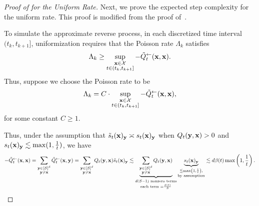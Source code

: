 \documentclass{article} %
\newcommand{\bfx}{{\bf x}}
\newcommand{\bfy}{ {\bf y}}
\begin{document}
\begin{proof}[Proof of  for the Uniform Rate] Next, we prove the expected step complexity for the uniform rate. This proof is modified from the proof of~\cite[Theorem~4.9]{ren2025discrete}.

To simulate the approximate reverse process, in each discretized time interval $(t_k, t_{k+1}]$, uniformization requires that the Poisson rate $\Lambda_k$ satisfies
    \[
        \Lambda_k \geq \sup_{\substack{\bfx \in \mathcal{X} \\ t \in (t_k, t_{k+1}]}} -\tilde{Q}^{\leftarrow}_t (\bfx, \bfx).
    \]
    Thus, suppose we choose the Poisson rate to be
    \begin{equation}\label{eq:Pois_rate_bound_uniform}
        \Lambda_k = C \cdot \sup_{\substack{\bfx \in \mathcal{X} \\ t \in (t_k, t_{k+1}]}} -\tilde{Q}^{\leftarrow}_t (\bfx, \bfx),
    \end{equation}
    for some constant $C \geq 1$.

    Thus, under the assumption that $\tilde{s}_{t}(\bfx)_\bfy \asymp s_{t}(\bfx)_\bfy$ when $Q_t(\bfy, \bfx) > 0$ and $s_t(\bfx)_\bfy \lesssim \max(1, \frac{1}{t})$, we have
    \begin{equation}\label{eq:sQ_bound_uniform}
    -\tilde{Q}_{t}^{\leftarrow}(\bfx, \bfx) = \sum_{\substack{\bfy\in{[S]^d} \\ \bfy\neq \bfx}} \tilde{Q}_{t}^{\leftarrow}(\bfx, \bfy) = \sum_{\substack{\bfy\in{[S]^d} \\ \bfy\neq \bfx}} Q_t(\bfy, \bfx) \tilde{s}_t(\bfx)_\bfy \lesssim \underbrace{\sum_{\substack{\bfy\in{[S]^d} \\ \bfy\neq \bfx}} Q_t(\bfy, \bfx)}_{\substack{d(S-1) \text{ nonzero terms} \\ \text{each term }=\frac{\beta(t)}{S}}} \underbrace{{s}_t(\bfx)_\bfy}_{\substack{\lesssim \max \left(1, \frac{1}{t} \right), \\ \text{by assumption}}} \lesssim d \beta(t) \max \left( 1, \frac{1}{t} \right).
    \end{equation}
    

\end{proof}
\end{document}
